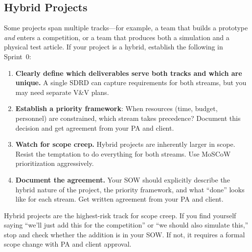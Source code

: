 \subsection{Hybrid Projects}

Some projects span multiple tracks---for example, a team that builds a prototype \emph{and} enters a competition, or a team that produces both a simulation and a physical test article. If your project is a hybrid, establish the following in Sprint~0:

\begin{enumerate}[nosep,leftmargin=1.5em]
\item \textbf{Clearly define which deliverables serve both tracks and which are unique.} A single SDRD can capture requirements for both streams, but you may need separate V\&V plans.
\item \textbf{Establish a priority framework}: When resources (time, budget, personnel) are constrained, which stream takes precedence? Document this decision and get agreement from your PA and client.
\item \textbf{Watch for scope creep.} Hybrid projects are inherently larger in scope. Resist the temptation to do everything for both streams. Use MoSCoW prioritization aggressively.
\item \textbf{Document the agreement.} Your SOW should explicitly describe the hybrid nature of the project, the priority framework, and what ``done'' looks like for each stream. Get written agreement from your PA and client.
\end{enumerate}

\begin{warnbox}
Hybrid projects are the highest-risk track for scope creep. If you find yourself saying ``we'll just add this for the competition'' or ``we should also simulate this,'' stop and check whether the addition is in your SOW. If not, it requires a formal scope change with PA and client approval.
\end{warnbox}


